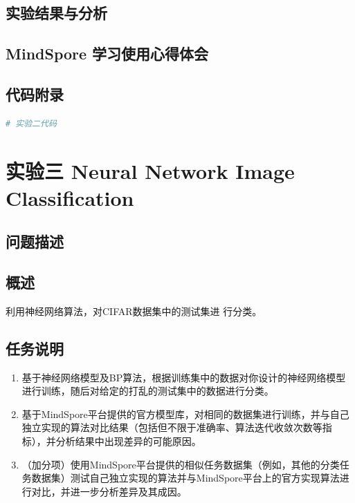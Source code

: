 \documentclass[12pt]{article}
\begin{document}
\subsubsection{}

\subsection{实验结果与分析}

\subsection{MindSpore 学习使用心得体会}

\subsection{代码附录}

\begin{lstlisting}[language=Python]
# 实验二代码
\end{lstlisting}

\newpage
\section{\centering 实验三 Neural Network Image Classification}

\subsection{问题描述}
\subsection{概述}
利用神经网络算法，对CIFAR数据集中的测试集进
行分类。
\subsection{任务说明}
\begin{enumerate}%
  \item 基于神经网络模型及BP算法，根据训练集中的数据对你设计的神经网络模型进行训练，随后对给定的打乱的测试集中的数据进行分类。

  \item 基于MindSpore平台提供的官方模型库，对相同的数据集进行训练，并与自己独立实现的算法对比结果（包括但不限于准确率、算法迭代收敛次数等指标），并分析结果中出现差异的可能原因。

  \item （加分项）使用MindSpore平台提供的相似任务数据集（例如，其他的分类任务数据集）测试自己独立实现的算法并与MindSpore平台上的官方实现算法进行对比，并进一步分析差异及其成因。
\end{enumerate}
\end{document}
